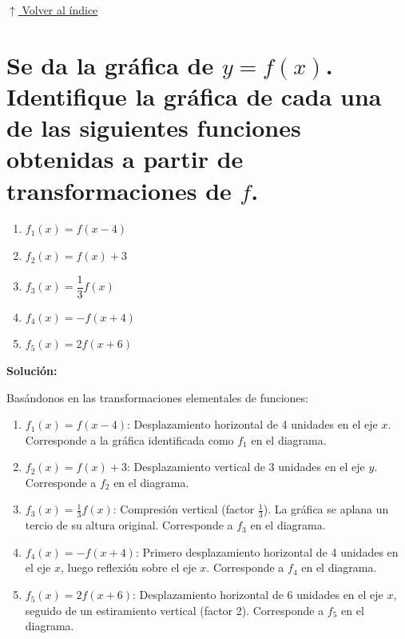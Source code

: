 \documentclass[12pt]{article}
\newcommand{\volverindice}{%
    \vspace{1em}%
    \begin{flushright}%
        \hyperlink{indice}{\small $\uparrow$ Volver al índice}%
    \end{flushright}%
}
\begin{document}
\volverindice
\newpage

\section[Identificación de transformaciones]{Se da la gráfica de $y = f(x)$. Identifique la gráfica de cada una de las siguientes funciones obtenidas a partir de transformaciones de $f$.}

\begin{enumerate}[label=\alph*.-]
    \item $f_1(x) = f(x - 4)$
    \item $f_2(x) = f(x) + 3$   
    \item $f_3(x) = \dfrac{1}{3}f(x)$
    \item $f_4(x) = -f(x + 4)$
    \item $f_5(x) = 2f(x + 6)$
\end{enumerate}

\textbf{Solución:}

Basándonos en las transformaciones elementales de funciones:

\begin{enumerate}[label=\alph*.-]
    \item $f_1(x) = f(x-4)$: Desplazamiento horizontal de 4 unidades en el eje $x$. Corresponde a la gráfica identificada como $f_1$ en el diagrama.
    \item $f_2(x) = f(x) + 3$: Desplazamiento vertical de 3 unidades en el eje $y$. Corresponde a $f_2$ en el diagrama.
    \item $f_3(x) = \frac{1}{3}f(x)$: Compresión vertical (factor $\frac{1}{3}$). La gráfica se aplana un tercio de su altura original. Corresponde a $f_3$ en el diagrama.
    \item $f_4(x) = -f(x+4)$: Primero desplazamiento horizontal de 4 unidades en el eje $x$, luego reflexión sobre el eje $x$. Corresponde a $f_4$ en el diagrama.
    \item $f_5(x) = 2f(x+6)$: Desplazamiento horizontal de 6 unidades en el eje $x$, seguido de un estiramiento vertical (factor 2). Corresponde a $f_5$ en el diagrama.
\end{enumerate}
\end{document}
